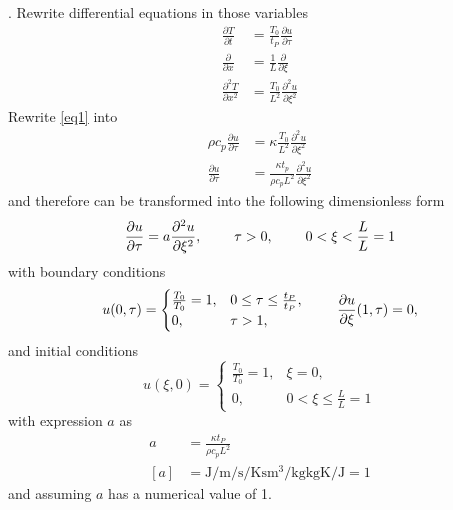 \documentclass{article}
\begin{document}
. Rewrite differential equations in those variables
\begin{equation}
\begin{split}
    \frac{\partial T}{\partial t} &= \frac{T_0}{t_P} \frac{\partial u}{\partial \tau} \\
    \frac{\partial}{\partial x} &= \frac{1}{L} \frac{\partial}{\partial \xi} \\
    \frac{\partial^2 T}{\partial x^2} &= \frac{T_0}{L^2} \frac{\partial^2 u}{\partial \xi^2}
\end{split}
\end{equation}
Rewrite \cref{eq1} into
\begin{equation}
\begin{split}
    \rho c_p \frac{\partial u}{\partial \tau} &= \kappa \frac{T_0}{L^2} \frac{\partial^2 u}{\partial \xi^2} \\
    \frac{\partial u}{\partial \tau} &= \frac{\kappa t_p}{\rho c_p L^2} \frac{\partial^2 u}{\partial \xi^2}
\end{split}
\end{equation}
and therefore can be transformed into the following dimensionless form
\begin{equation}
    \frac{\partial u}{\partial \tau} = a \frac{\partial^2 u}{\partial \xi^2}, \hspace{0.8cm} \tau > 0, \hspace{0.8cm} 0 < \xi < \frac{L}{L}=1
\end{equation}
with boundary conditions
\begin{equation}   \label{BC}
   u(0,\tau)= 
\begin{cases}
    \frac{T_0}{T_0} = 1,           & 0 \leq \tau \leq \frac{t_P}{t_P}, \\
    0,              & \tau > 1,
\end{cases}
   \hspace{0.8cm}         \frac{\partial u}{\partial \xi}(1,\tau) = 0,
\end{equation}
and initial conditions
\begin{equation} 
   u(\xi,0) = 
\begin{cases}
    \frac{T_0}{T_0} = 1,           & \xi = 0, \\
    0,              & 0 < \xi \leq \frac{L}{L}=1
\end{cases}
\end{equation}
with expression $a$ as
\begin{equation}
\begin{split}
    a &= \frac{\kappa t_P}{\rho c_p L^2} \\
    [a] &= \si{\joule\per\meter\per\second\per\kelvin\second\meter\cubed\per\kilo\gram\kilo\gram\kelvin\per\joule}
    = 1
\end{split}
\end{equation}
and assuming $a$ has a numerical value of 1.
\end{document}
